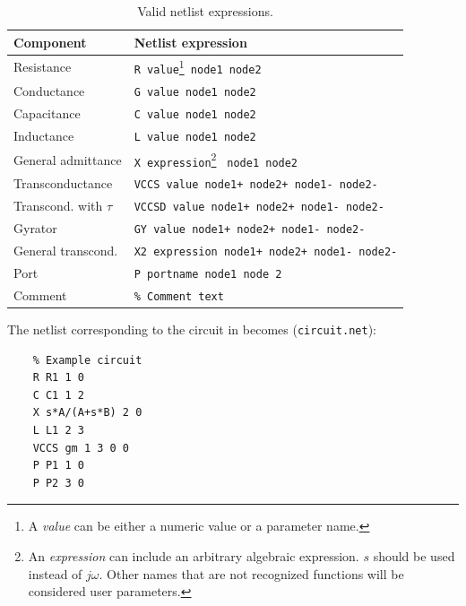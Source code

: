 \begin{table}[htbf]
    \centering
  \caption{Valid netlist expressions.}\label{tab:Netlist}
    \begin{minipage}{\textwidth}
    \centering
    \begin{small}
    \begin{tabular}{l|l}
    Component & Netlist expression\\
    \hline
    Resistance & \verb"R value"\footnote{A \emph{value} can be either a numeric value or a parameter name.}\verb" node1 node2"\\
    Conductance & \verb"G value node1 node2"\\
    Capacitance & \verb"C value node1 node2"\\
    Inductance & \verb"L value node1 node2"\\
    General admittance & \verb"X expression"\footnote{An \emph{expression} can include an arbitrary algebraic expression. $s$ should be used instead of $j\omega$. Other names that are not recognized functions will be considered user parameters.} \verb" node1 node2"\\
    Transconductance& \verb"VCCS value node1+ node2+ node1- node2-"\\
    Transcond. with $\tau$& \verb"VCCSD value node1+ node2+ node1- node2-"\\
    Gyrator & \verb"GY value node1+ node2+ node1- node2-"\\
    General transcond. & \verb"X2 expression node1+ node2+ node1- node2-"\\
    Port & \verb"P portname node1 node 2"\\
    Comment & \verb"% Comment text" \\
    \hline
    \end{tabular}
    \end{small}
    \end{minipage}
\end{table}

The netlist corresponding to the circuit in 
becomes (\verb"circuit.net"):
\begin{small}
\begin{verbatim}
    % Example circuit
    R R1 1 0
    C C1 1 2
    X s*A/(A+s*B) 2 0
    L L1 2 3
    VCCS gm 1 3 0 0
    P P1 1 0
    P P2 3 0
\end{verbatim}
\end{small}

